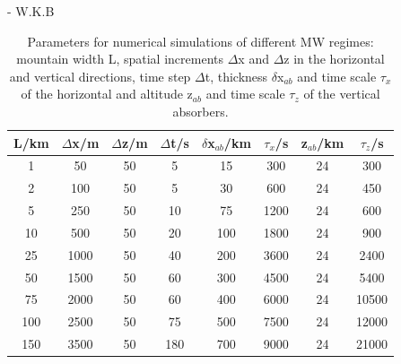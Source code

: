 - W.K.B


\begin{table}[ht]
\centering
\caption{Parameters for numerical simulations of different MW regimes: mountain width L, spatial increments $\Delta$x and $\Delta$z in the horizontal and vertical directions, time step $\Delta$t, thickness $\delta$x$_{ab}$ and time scale $\tau_x$ of the horizontal and altitude z$_{ab}$ and time scale $\tau_z$ of the vertical absorbers.}

\begin{tabular}{@{}cccccccc@{}}
\toprule
L/km & $\Delta$x/m & $\Delta$z/m & $\Delta$t/s & $\delta$x$_{ab}$/km & $\tau_x$/s  & z$_{ab}$/km & $\tau_z$/s \\ \midrule[1pt]

1   & 50  & 50 & 5   & 15  & 300  & 24 & 300   \\
2   & 100  & 50 & 5   & 30  & 600  & 24 & 450   \\
5   & 250  & 50 & 10  & 75  & 1200 & 24 & 600  \\
10  & 500 & 50 & 20  & 100 & 1800 & 24 & 900  \\
25  & 1000 & 50 & 40  & 200 & 3600 & 24 & 2400  \\
50  & 1500 & 50 & 60  & 300 & 4500 & 24 & 5400  \\
75  & 2000 & 50 & 60  & 400 & 6000 & 24 & 10500 \\
100 & 2500 & 50 & 75  & 500 & 7500 & 24 & 12000 \\
150 & 3500 & 50 & 180 & 700 & 9000 & 24 & 21000 \\

\bottomrule
\end{tabular}
\label{tab:linearRegimes}
\end{table}


